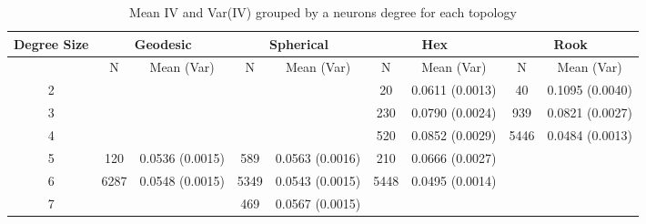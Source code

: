 \begin{table}[hbt]
\caption{Mean IV and Var(IV) grouped by a neurons degree for each topology}
\label{meanvar1}
\begin{tabular}{|c||c|c||c|c||c|c||c|c|}
\hline
\textbf{Degree Size} & \multicolumn{2}{c||}{\textbf{Geodesic}} &
\multicolumn{2}{c||}{\textbf{Spherical}} & \multicolumn{2}{c||}{\textbf{Hex}} &
\multicolumn{2}{c||}{\textbf{Rook}} \\
\hline
& N & Mean (Var) & N & Mean (Var) & N & Mean (Var) & N & Mean (Var) \\
\hline
2&&&&& 20& 0.0611 (0.0013)& 40& 0.1095 (0.0040)\\ 
3&&&&& 230& 0.0790 (0.0024)& 939& 0.0821 (0.0027)\\ 
4&&&&& 520& 0.0852 (0.0029)& 5446& 0.0484 (0.0013)\\ 
5& 120& 0.0536 (0.0015)& 589& 0.0563 (0.0016)& 210& 0.0666 (0.0027)&&\\ 
6& 6287& 0.0548 (0.0015)& 5349& 0.0543 (0.0015)& 5448& 0.0495 (0.0014)&&\\ 
7&&& 469& 0.0567 (0.0015)&&&&\\ 
\hline
\end{tabular} \end{table}





